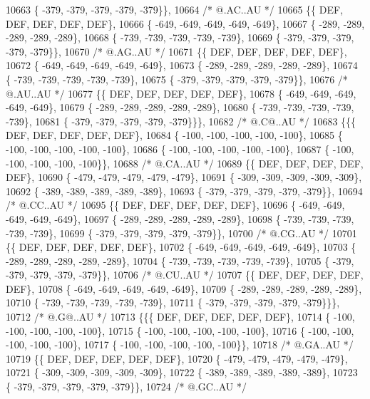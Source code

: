 \begin{DoxyCode}
10663 \{ -379, -379, -379, -379, -379\}\},
10664 \textcolor{comment}{/*  @.AC..AU */}
10665 \{\{  DEF,  DEF,  DEF,  DEF,  DEF\},
10666 \{ -649, -649, -649, -649, -649\},
10667 \{ -289, -289, -289, -289, -289\},
10668 \{ -739, -739, -739, -739, -739\},
10669 \{ -379, -379, -379, -379, -379\}\},
10670 \textcolor{comment}{/*  @.AG..AU */}
10671 \{\{  DEF,  DEF,  DEF,  DEF,  DEF\},
10672 \{ -649, -649, -649, -649, -649\},
10673 \{ -289, -289, -289, -289, -289\},
10674 \{ -739, -739, -739, -739, -739\},
10675 \{ -379, -379, -379, -379, -379\}\},
10676 \textcolor{comment}{/*  @.AU..AU */}
10677 \{\{  DEF,  DEF,  DEF,  DEF,  DEF\},
10678 \{ -649, -649, -649, -649, -649\},
10679 \{ -289, -289, -289, -289, -289\},
10680 \{ -739, -739, -739, -739, -739\},
10681 \{ -379, -379, -379, -379, -379\}\}\},
10682 \textcolor{comment}{/*  @.C@..AU */}
10683 \{\{\{  DEF,  DEF,  DEF,  DEF,  DEF\},
10684 \{ -100, -100, -100, -100, -100\},
10685 \{ -100, -100, -100, -100, -100\},
10686 \{ -100, -100, -100, -100, -100\},
10687 \{ -100, -100, -100, -100, -100\}\},
10688 \textcolor{comment}{/*  @.CA..AU */}
10689 \{\{  DEF,  DEF,  DEF,  DEF,  DEF\},
10690 \{ -479, -479, -479, -479, -479\},
10691 \{ -309, -309, -309, -309, -309\},
10692 \{ -389, -389, -389, -389, -389\},
10693 \{ -379, -379, -379, -379, -379\}\},
10694 \textcolor{comment}{/*  @.CC..AU */}
10695 \{\{  DEF,  DEF,  DEF,  DEF,  DEF\},
10696 \{ -649, -649, -649, -649, -649\},
10697 \{ -289, -289, -289, -289, -289\},
10698 \{ -739, -739, -739, -739, -739\},
10699 \{ -379, -379, -379, -379, -379\}\},
10700 \textcolor{comment}{/*  @.CG..AU */}
10701 \{\{  DEF,  DEF,  DEF,  DEF,  DEF\},
10702 \{ -649, -649, -649, -649, -649\},
10703 \{ -289, -289, -289, -289, -289\},
10704 \{ -739, -739, -739, -739, -739\},
10705 \{ -379, -379, -379, -379, -379\}\},
10706 \textcolor{comment}{/*  @.CU..AU */}
10707 \{\{  DEF,  DEF,  DEF,  DEF,  DEF\},
10708 \{ -649, -649, -649, -649, -649\},
10709 \{ -289, -289, -289, -289, -289\},
10710 \{ -739, -739, -739, -739, -739\},
10711 \{ -379, -379, -379, -379, -379\}\}\},
10712 \textcolor{comment}{/*  @.G@..AU */}
10713 \{\{\{  DEF,  DEF,  DEF,  DEF,  DEF\},
10714 \{ -100, -100, -100, -100, -100\},
10715 \{ -100, -100, -100, -100, -100\},
10716 \{ -100, -100, -100, -100, -100\},
10717 \{ -100, -100, -100, -100, -100\}\},
10718 \textcolor{comment}{/*  @.GA..AU */}
10719 \{\{  DEF,  DEF,  DEF,  DEF,  DEF\},
10720 \{ -479, -479, -479, -479, -479\},
10721 \{ -309, -309, -309, -309, -309\},
10722 \{ -389, -389, -389, -389, -389\},
10723 \{ -379, -379, -379, -379, -379\}\},
10724 \textcolor{comment}{/*  @.GC..AU */}

\end{DoxyCode}
